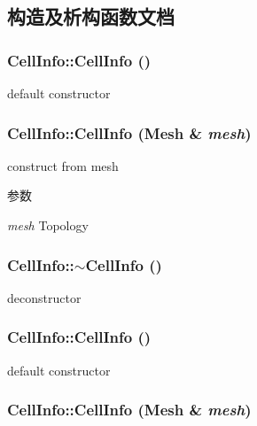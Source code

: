 \subsection{构造及析构函数文档}
\hypertarget{classCellInfo_ae62d1b965db7b566806e13862e29daec}{
\subsubsection[{CellInfo}]{\setlength{\rightskip}{0pt plus 5cm}CellInfo::CellInfo ()}}
\label{classCellInfo_ae62d1b965db7b566806e13862e29daec}


default constructor \hypertarget{classCellInfo_a31364f58aca27a794a93dbed16011bc6}{
\subsubsection[{CellInfo}]{\setlength{\rightskip}{0pt plus 5cm}CellInfo::CellInfo (Mesh \& {\em mesh})}}
\label{classCellInfo_a31364f58aca27a794a93dbed16011bc6}


construct from mesh 
\begin{DoxyParams}{参数}
\item[{\em mesh}]Topology \end{DoxyParams}
\hypertarget{classCellInfo_aea4f621af2ea308f7ecfb4118847751e}{
\subsubsection[{$\sim$CellInfo}]{\setlength{\rightskip}{0pt plus 5cm}CellInfo::$\sim$CellInfo ()}}
\label{classCellInfo_aea4f621af2ea308f7ecfb4118847751e}


deconstructor \hypertarget{classCellInfo_ae62d1b965db7b566806e13862e29daec}{
\subsubsection[{CellInfo}]{\setlength{\rightskip}{0pt plus 5cm}CellInfo::CellInfo ()}}
\label{classCellInfo_ae62d1b965db7b566806e13862e29daec}


default constructor \hypertarget{classCellInfo_a31364f58aca27a794a93dbed16011bc6}{
\subsubsection[{CellInfo}]{\setlength{\rightskip}{0pt plus 5cm}CellInfo::CellInfo (Mesh \& {\em mesh})}}
\label{classCellInfo_a31364f58aca27a794a93dbed16011bc6}


